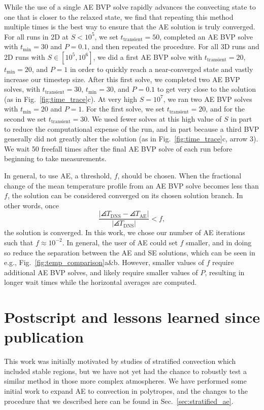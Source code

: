 While the use of a single AE BVP solve rapidly advances the convecting state to one that is closer to the relaxed state, we find that repeating this method multiple times is the best way to ensure that the AE solution is truly converged. 
For all runs in 2D at $S < 10^5$, we set $t_{\text{transient}} = 50$, completed an AE BVP solve with $t_{\text{min}} = 30$ and $P = 0.1$, and then repeated the procedure.
For all 3D runs and 2D runs with $S \in [10^5, 10^6]$, we did a first AE BVP solve with $t_{\text{transient}} = 20$, $t_{\text{min}} = 20$, and $P = 1$ in order to quickly reach a near-converged state and vastly increase our timestep size.  
After this first solve, we completed two AE BVP solves, with $t_{\text{transient}} = 30$, $t_{\text{min}} = 30$, and $P = 0.1$ to get very close to the solution (as in Fig.~\ref{fig:time_trace}c).
At very high $S = 10^7$, we ran two AE BVP solves with $t_{\text{min}} = 20$ and $P = 1$. For the first solve, we set $t_{\text{transient}} = 20$, and for the second we set $t_{\text{transient}} = 30$. 
We used fewer solves at this high value of $S$ in part to reduce the computational expense of the run, and in part because a third BVP generally did not greatly alter the solution (as in Fig.~\ref{fig:time_trace}c, arrow 3). 
We wait 50 freefall times after the final AE BVP solve of each run before beginning to take measurements.

In general, to use AE, a threshold, $f$, should be chosen. 
When the fractional change of the mean temperature profile from an AE BVP solve becomes less than $f$, the solution can be considered converged on its chosen solution branch.
In other words, once
\begin{equation}
\frac{|\angles{T}_{\text{DNS}} - \angles{T}_{\text{AE}}|}{|\angles{T}_{\text{DNS}}|} < f,
\end{equation}
the solution is converged. 
In this work, we chose our number of AE iterations such that $f \approx 10^{-2}$.  
In general, the user of AE could set $f$ smaller, and in doing so reduce the separation between the AE and SE solutions, which can be seen in e.g., Fig.~\ref{fig:temp_comparison}a\&b. 
However, smaller values of $f$ require additional AE BVP solves, and likely require smaller values of $P$, resulting in longer wait times while the horizontal averages are computed.

\newpage
\section{Postscript and lessons learned since publication}
\label{sec:abo18_postscript}
This work was initially motivated by studies of stratified convection which included stable regions, but we have not yet had the chance to robustly test a similar method in those more complex atmospheres.
We have performed some initial work to expand AE to convection in polytropes, and the changes to the procedure that we described here can be found in Sec.~\ref{sec:stratified_ae}.

